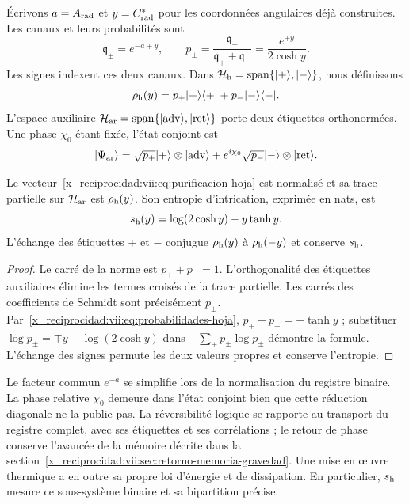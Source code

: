 Écrivons \(a=A_{\rm rad}\) et \(y=C^*_{\rm rad}\) pour les
coordonnées angulaires déjà construites. Les canaux et leurs probabilités sont
\begin{equation}
 \mathfrak q_\pm=e^{-a\mp y},\qquad
 p_\pm=\frac{\mathfrak q_\pm}{\mathfrak q_++\mathfrak q_-}
       =\frac{e^{\mp y}}{2\cosh y}.
 \label{x_reciprocidad:vii:eq:probabilidades-hoja}
\end{equation}
Les signes indexent ces deux canaux. Dans
\(\mathcal H_{\rm h}=\operatorname{span}\{|+\rangle,|-\rangle\}\),
nous définissons
\[
 \rho_{\rm h}(y)=p_+|+\rangle\langle+|+p_-|-\rangle\langle-|.
\]
L'espace auxiliaire \(\mathcal H_{\rm ar}=\operatorname{span}
\{|\mathrm{adv}\rangle,|\mathrm{ret}\rangle\}\) porte deux étiquettes orthonormées. Une phase \(\chi_0\) étant fixée, l'état conjoint est
\begin{equation}
 |\Psi_{\rm ar}\rangle
 =\sqrt{p_+}|+\rangle\otimes|\mathrm{adv}\rangle
  +e^{i\chi_0}\sqrt{p_-}|-\rangle\otimes|\mathrm{ret}\rangle.
 \label{x_reciprocidad:vii:eq:purificacion-hoja}
\end{equation}

\begin{proposition}
\label{x_reciprocidad:vii:prop:purificacion-hoja}
Le vecteur~\eqref{x_reciprocidad:vii:eq:purificacion-hoja} est normalisé et sa trace
partielle sur \(\mathcal H_{\rm ar}\) est \(\rho_{\rm h}(y)\).
Son entropie d'intrication, exprimée en nats, est
\begin{equation}
 s_{\rm h}(y)=\log(2\cosh y)-y\tanh y.
 \label{x_reciprocidad:vii:eq:entropia-hoja}
\end{equation}
L'échange des étiquettes \(+\) et \(-\) conjugue
\(\rho_{\rm h}(y)\) à \(\rho_{\rm h}(-y)\) et conserve
\(s_{\rm h}\).
\end{proposition}
\begin{proof}
Le carré de la norme est \(p_++p_-=1\). L'orthogonalité des étiquettes auxiliaires élimine les termes croisés de la trace partielle. Les carrés des coefficients de Schmidt sont précisément \(p_\pm\). Par~\eqref{x_reciprocidad:vii:eq:probabilidades-hoja}, \(p_+-p_-=-\tanh y\) ; substituer \(\log p_\pm=\mp y-\log(2\cosh y)\) dans \(-\sum_\pm p_\pm\log p_\pm\) démontre la formule. L'échange des signes permute les deux valeurs propres et conserve l'entropie.
\end{proof}

Le facteur commun \(e^{-a}\) se simplifie lors de la normalisation du registre binaire.
La phase relative \(\chi_0\) demeure dans l'état conjoint bien que cette
réduction diagonale ne la publie pas. La réversibilité logique se rapporte
au transport du registre complet, avec ses étiquettes et ses corrélations ;
le retour de phase conserve l'avancée de la mémoire décrite dans la
section~\ref{x_reciprocidad:vii:sec:retorno-memoria-gravedad}. Une mise en œuvre thermique
a en outre sa propre loi d'énergie et de dissipation. En particulier,
\(s_{\rm h}\) mesure ce sous-système binaire et sa bipartition précise.

